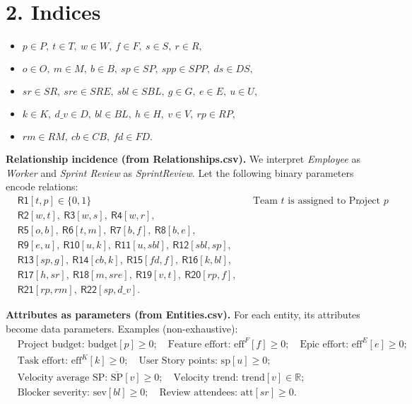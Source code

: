 \documentclass[11pt]{article}
\begin{document}
\section{2. Indices}
\begin{itemize}[leftmargin=2em]
  \item $p\in P,~ t\in T,~ w\in W,~ f\in F,~ s\in S,~ r\in R,$
  \item $o\in O,~ m\in M,~ b\in B,~ sp\in SP,~ spp\in SPP,~ ds\in DS,$
  \item $sr\in SR,~ sre\in SRE,~ sbl\in SBL,~ g\in G,~ e\in E,~ u\in U,$
  \item $k\in K,~ d\_v\in D,~ bl\in BL,~ h\in H,~ v\in V,~ rp\in RP,$
  \item $rm\in RM,~ cb\in CB,~ fd\in FD.$
\end{itemize}

\noindent \textbf{Relationship incidence (from Relationships.csv).} We interpret \textit{Employee} as \textit{Worker} and \textit{Sprint Review} as \textit{SprintReview}. Let the following binary parameters encode relations:
\[
\begin{aligned}
&\mathsf{R1}[t,p]\in\{0,1\} && \text{Team $t$ is assigned to Project $p$},\\
&\mathsf{R2}[w,t],~\mathsf{R3}[w,s],~\mathsf{R4}[w,r],\\
&\mathsf{R5}[o,b],~\mathsf{R6}[t,m],~\mathsf{R7}[b,f],~\mathsf{R8}[b,e],\\
&\mathsf{R9}[e,u],~\mathsf{R10}[u,k],~\mathsf{R11}[u,sbl],~\mathsf{R12}[sbl,sp],\\
&\mathsf{R13}[sp,g],~\mathsf{R14}[cb,k],~\mathsf{R15}[fd,f],~\mathsf{R16}[k,bl],\\
&\mathsf{R17}[h,sr],~\mathsf{R18}[m,sre],~\mathsf{R19}[v,t],~\mathsf{R20}[rp,f],\\
&\mathsf{R21}[rp,rm],~\mathsf{R22}[sp,d\_v].
\end{aligned}
\]

\noindent \textbf{Attributes as parameters (from Entities.csv).} For each entity, its attributes become data parameters. Examples (non-exhaustive):
\[
\begin{aligned}
&\text{Project budget: } \mathrm{budget}[p]\ge 0; \quad
\text{Feature effort: } \mathrm{eff}^{F}[f]\ge 0; \quad
\text{Epic effort: } \mathrm{eff}^{E}[e]\ge 0; \\
&\text{Task effort: } \mathrm{eff}^{K}[k]\ge 0; \quad
\text{User Story points: } \mathrm{sp}[u]\ge 0; \\
&\text{Velocity average SP: } \overline{\mathrm{SP}}[v]\ge 0; \quad
\text{Velocity trend: } \mathrm{trend}[v]\in\mathbb{R};\\
&\text{Blocker severity: } \mathrm{sev}[bl]\ge 0; \quad
\text{Review attendees: } \mathrm{att}[sr]\ge 0.
\end{aligned}
\]
\end{document}
